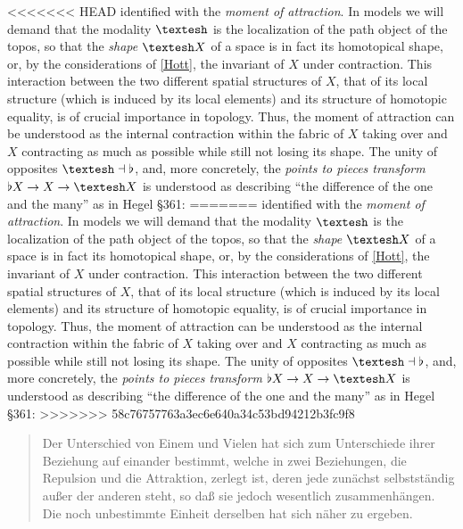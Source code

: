 \documentclass{article}
\begin{document}
<<<<<<< HEAD
identified with the \emph{moment of attraction}. In models we will demand that the modality 
$\textrm{\textesh}$ is the localization of the path object of the topos, so that the \emph{shape} 
$\textrm{\textesh} X$ of a space is in fact its homotopical shape, or, by the considerations of \ref{Hott}, 
the invariant of $X$ under contraction. This interaction between the two different spatial structures of $X$,
that of its local structure (which is induced by its local elements) and its structure of homotopic equality,
is of crucial importance in topology. Thus, the moment of attraction can be understood as the internal
contraction within the fabric of $X$ taking over and $X$ contracting as much as possible while still not
losing its shape. The unity of opposites $\textrm{\textesh}\dashv\flat$, and, more concretely, the
\emph{points to pieces transform} $\flat X\rightarrow X\rightarrow \textrm{\textesh} X$ is understood as
describing ``the difference of the one and the many'' as in Hegel §361:
=======
identified with the \emph{moment of attraction}. In models we will demand that the modality $\textrm{\textesh}$
is the localization of the path object of the topos, so that the \emph{shape} $\textrm{\textesh} X$ of
a space is in fact its homotopical shape, or, by the considerations of \ref{Hott}, the invariant of $X$
under contraction. This interaction between the two different spatial structures of $X$, that of its local
structure (which is induced by its local elements) and its structure of homotopic equality, is of crucial
importance in topology. Thus, the moment of attraction can be understood as the internal contraction within
the fabric of $X$ taking over and $X$ contracting as much as possible while still not losing its shape.
The unity of opposites $\textrm{\textesh}\dashv\flat$, and, more concretely, the \emph{points to pieces
transform} $\flat X\rightarrow X\rightarrow \textrm{\textesh} X$ is understood as describing ``the difference
of the one and the many'' as in Hegel §361:
>>>>>>> 58c76757763a3ec6e640a34c53bd94212b3fc9f8

\begin{quote}
    Der Unterschied von Einem und Vielen hat sich zum Unterschiede ihrer Beziehung auf einander bestimmt,
welche in zwei Beziehungen, die Repulsion und die Attraktion, zerlegt ist, deren jede zunächst selbstständig
außer der anderen steht, so daß sie jedoch wesentlich zusammenhängen. Die noch unbestimmte Einheit derselben
hat sich näher zu ergeben.
\end{quote}
    
\end{document}
